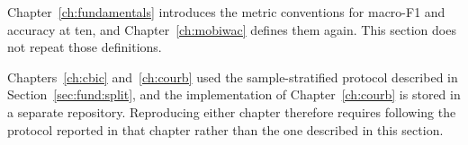 Chapter~\ref{ch:fundamentals} introduces the metric conventions for macro-F1 and
accuracy at ten, and Chapter~\ref{ch:mobiwac} defines them again. This section does not
repeat those definitions.

Chapters~\ref{ch:cbic} and~\ref{ch:courb} used the sample-stratified protocol described
in Section~\ref{sec:fund:split}, and the implementation of Chapter~\ref{ch:courb} is stored in
a separate repository. Reproducing either chapter therefore requires following the
protocol reported in that chapter rather than the one described in this section.
